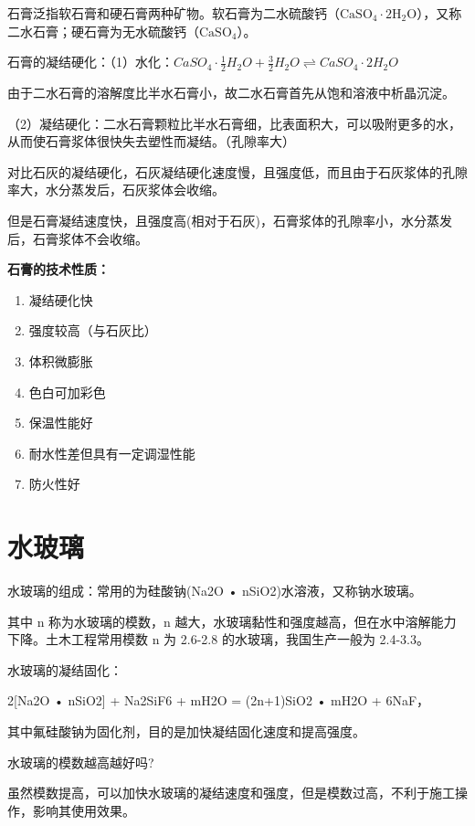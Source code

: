 \documentclass[12pt, a4paper, oneside, UTF8]{ctexbook}
\begin{document}
石膏泛指软石膏和硬石膏两种矿物。软石膏为二水硫酸钙（\(\mathrm{CaSO_{4}\cdot2H_{2}O}\)），又称二水石膏；硬石膏为无水硫酸钙（\(\mathrm{CaSO_{4}}\)）。

石膏的凝结硬化：（1）水化：$CaSO_4 \cdot \frac{1}{2}H_2O + \frac{3}{2}H_2O \rightleftharpoons CaSO_4 \cdot 2H_2O$

由于二水石膏的溶解度比半水石膏小，故二水石膏首先从饱和溶液中析晶沉淀。

（2）凝结硬化：二水石膏颗粒比半水石膏细，比表面积大，可以吸附更多的水，从而使石膏浆体很快失去塑性而凝结。（孔隙率大）

\begin{remark}
    对比石灰的凝结硬化，石灰凝结硬化速度慢，且强度低，而且由于石灰浆体的孔隙率大，水分蒸发后，石灰浆体会收缩。

    但是石膏凝结速度快，且强度高(相对于石灰)，石膏浆体的孔隙率小，水分蒸发后，石膏浆体不会收缩。
\end{remark}

\textbf{石膏的技术性质：}

\begin{enumerate}
    \item 凝结硬化快
    \item 强度较高（与石灰比）
    \item 体积微膨胀
    \item 色白可加彩色
    \item 保温性能好
    \item 耐水性差但具有一定调湿性能
    \item 防火性好
\end{enumerate}

\newpage

\section{水玻璃}
水玻璃的组成：常用的为硅酸钠(Na2O • nSiO2)水溶液，又称钠水玻璃。

其中 n 称为水玻璃的模数，n 越大，水玻璃黏性和强度越高，但在水中溶解能力下降。土木工程常用模数 n 为 2.6-2.8 的水玻璃，我国生产一般为 2.4-3.3。

水玻璃的凝结固化：

2[Na2O • nSiO2] + Na2SiF6 + mH2O = (2n+1)SiO2 • mH2O + 6NaF，

其中氟硅酸钠为固化剂，目的是加快凝结固化速度和提高强度。

\begin{example}
    水玻璃的模数越高越好吗?

    虽然模数提高，可以加快水玻璃的凝结速度和强度，但是模数过高，不利于施工操作，影响其使用效果。
\end{example}
\end{document}
